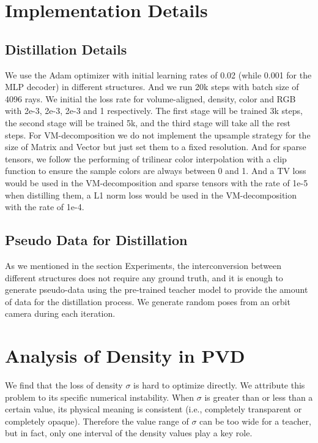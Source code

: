 \documentclass[letterpaper]{article} \usepackage{aaai23}  \usepackage{times}  \usepackage{helvet}  \usepackage{courier}  \usepackage[hyphens]{url}  \usepackage{graphicx} \urlstyle{rm} \def\UrlFont{\rm}  \usepackage{natbib}  \usepackage{caption} \frenchspacing  \setlength{\pdfpagewidth}{8.5in}  \setlength{\pdfpageheight}{11in}  \usepackage{multirow}
\begin{document}
\section{Implementation Details}
\subsection{Distillation Details}We use the Adam optimizer with initial learning rates of 0.02 (while 0.001 for the MLP decoder) in different structures. And we run 20k steps with batch size of 4096 rays. We initial the loss rate for volume-aligned, density, color and RGB with 2e-3, 2e-3, 2e-3 and 1 respectively. The first stage will be trained 3k steps, the second stage will be trained 5k, and the third stage will take all the rest steps. For VM-decomposition we do not implement the upsample strategy for the size of Matrix and Vector but just set them to a fixed resolution. And for sparse tensors, we follow the performing of trilinear color interpolation with a clip function to ensure the sample colors are always between 0 and 1. And a TV loss would be used in the VM-decomposition and sparse tensors with the rate of 1e-5 when distilling them, a L1 norm loss would be used in the VM-decomposition with the rate of 1e-4.

\subsection{Pseudo Data for Distillation}
As we mentioned in the section Experiments, the interconversion between different structures does not require any ground truth, and it is enough to generate pseudo-data using the pre-trained teacher model to provide the amount of data for the distillation process. We generate random poses from an orbit camera during each iteration.

\section{Analysis of Density in PVD}
We find that the loss of density $\sigma$ is hard to optimize directly. We attribute this problem to its specific numerical instability. When $\sigma$ is greater than or less than a certain value, its physical meaning is consistent (i.e., completely transparent or completely opaque). Therefore the value range of $\sigma$ can be too wide for a teacher, but in fact, only one interval of the density values play a key role. 
\end{document}
